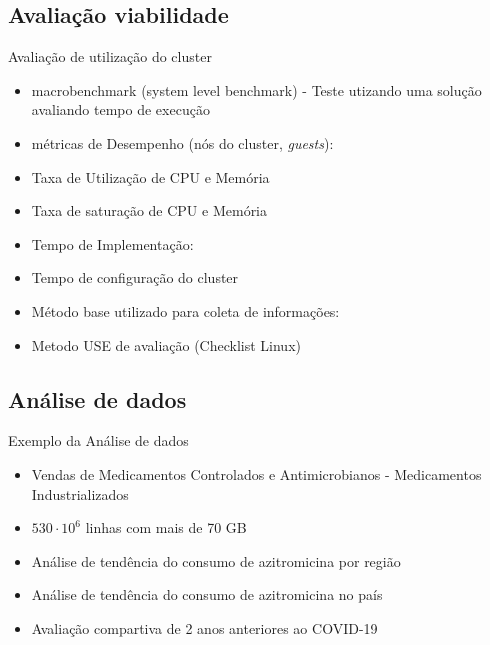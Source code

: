 \documentclass[10pt,brazil]{beamer}
\theoremstyle{definition}
\begin{document}
\subsection{Avaliação viabilidade}

\begin{frame}[allowframebreaks]{Avaliação de utilização do cluster}
  
  \begin{itemize}
      \item macrobenchmark (system level benchmark) - Teste utizando uma solução avaliando tempo de execução
      \item[] métricas de Desempenho (nós do cluster, \emph{guests}):
      \item Taxa de Utilização de CPU e Memória 
      \item Taxa de saturação de CPU e Memória
      \item[] Tempo de Implementação:
      \item Tempo de configuração do cluster
      \item[] Método base utilizado para coleta de informações:
      \item Metodo USE de avaliação (Checklist Linux)
  \end{itemize}
\end{frame}


\subsection{Análise de dados}

\begin{frame}{Exemplo da Análise de dados}
  \begin{itemize}
    \item Vendas de Medicamentos Controlados e Antimicrobianos - Medicamentos Industrializados
    \item $530 \cdot 10^{6}$ linhas com mais de 70 GB
    \item Análise de tendência do consumo de azitromicina por região
    \item Análise de tendência do consumo de azitromicina no país
    \item Avaliação compartiva de 2 anos anteriores ao COVID-19
  \end{itemize}
\end{frame}

\end{document}
